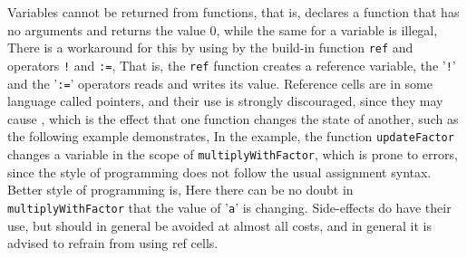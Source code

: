 Variables cannot be returned from functions, that is,
declares a function that has no arguments and returns the value 0, while the same for a variable is illegal,
There is a workaround for this by using  by the build-in function \texttt{ref} and operators \verb|!| and \verb|:=|,
That is, the \texttt{ref} function creates a reference variable, the '\verb|!|' and the '\verb|:=|' operators reads and writes its value. Reference cells are in some language called pointers, and their use is strongly discouraged, since they may cause , which is the effect that one function changes the state of another, such as the following example demonstrates,
In the example, the function \texttt{updateFactor} changes a variable in the scope of \texttt{multiplyWithFactor}, which is prone to errors, since the style of programming does not follow the usual assignment syntax. Better style of programming is,
Here there can be no doubt in \texttt{multiplyWithFactor} that the value of '\texttt{a}' is changing. Side-effects do have their use, but should in general be avoided at almost all costs, and in general it is advised to refrain from using ref cells.


